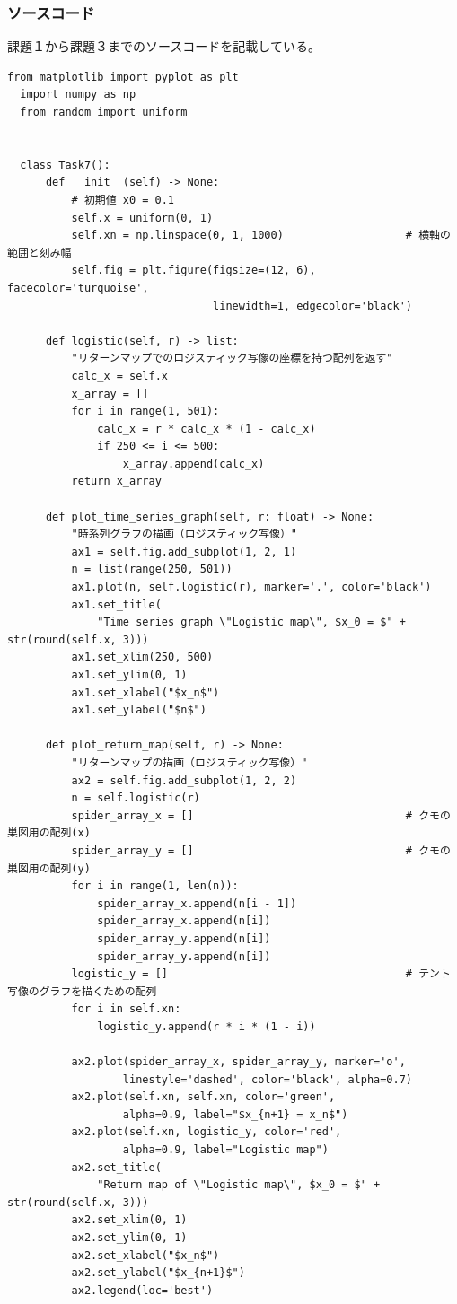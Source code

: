 \subsubsection{ソースコード}
課題１から課題３までのソースコードを記載している。
\begin{lstlisting}[caption=task7.py]
  from matplotlib import pyplot as plt
  import numpy as np
  from random import uniform


  class Task7():
      def __init__(self) -> None:
          # 初期値 x0 = 0.1
          self.x = uniform(0, 1)
          self.xn = np.linspace(0, 1, 1000)                   # 横軸の範囲と刻み幅
          self.fig = plt.figure(figsize=(12, 6), facecolor='turquoise',
                                linewidth=1, edgecolor='black')

      def logistic(self, r) -> list:
          "リターンマップでのロジスティック写像の座標を持つ配列を返す"
          calc_x = self.x
          x_array = []
          for i in range(1, 501):
              calc_x = r * calc_x * (1 - calc_x)
              if 250 <= i <= 500:
                  x_array.append(calc_x)
          return x_array

      def plot_time_series_graph(self, r: float) -> None:
          "時系列グラフの描画（ロジスティック写像）"
          ax1 = self.fig.add_subplot(1, 2, 1)
          n = list(range(250, 501))
          ax1.plot(n, self.logistic(r), marker='.', color='black')
          ax1.set_title(
              "Time series graph \"Logistic map\", $x_0 = $" + str(round(self.x, 3)))
          ax1.set_xlim(250, 500)
          ax1.set_ylim(0, 1)
          ax1.set_xlabel("$x_n$")
          ax1.set_ylabel("$n$")

      def plot_return_map(self, r) -> None:
          "リターンマップの描画（ロジスティック写像）"
          ax2 = self.fig.add_subplot(1, 2, 2)
          n = self.logistic(r)
          spider_array_x = []                                 # クモの巣図用の配列(x)
          spider_array_y = []                                 # クモの巣図用の配列(y)
          for i in range(1, len(n)):
              spider_array_x.append(n[i - 1])
              spider_array_x.append(n[i])
              spider_array_y.append(n[i])
              spider_array_y.append(n[i])
          logistic_y = []                                     # テント写像のグラフを描くための配列
          for i in self.xn:
              logistic_y.append(r * i * (1 - i))

          ax2.plot(spider_array_x, spider_array_y, marker='o',
                  linestyle='dashed', color='black', alpha=0.7)
          ax2.plot(self.xn, self.xn, color='green',
                  alpha=0.9, label="$x_{n+1} = x_n$")
          ax2.plot(self.xn, logistic_y, color='red',
                  alpha=0.9, label="Logistic map")
          ax2.set_title(
              "Return map of \"Logistic map\", $x_0 = $" + str(round(self.x, 3)))
          ax2.set_xlim(0, 1)
          ax2.set_ylim(0, 1)
          ax2.set_xlabel("$x_n$")
          ax2.set_ylabel("$x_{n+1}$")
          ax2.legend(loc='best')


\end{lstlisting}
